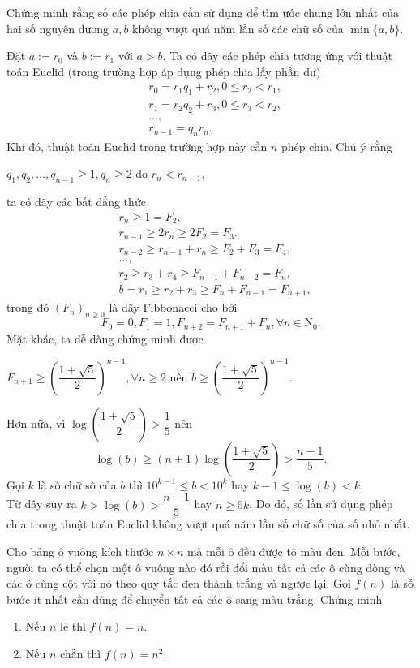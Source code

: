 \begin{bt} [Láme]
	Chứng minh rằng số các phép chia cần sử dụng để tìm ước chung lớn nhất của hai số nguyên dương $a,b$ không vượt quá năm lần số các chữ số của $ \min{\{a,b\}} $.
	
	Đặt $a:= r_{0} $ và $b:= r_{1}$ với $a>b$. Ta có dãy các phép chia tương ứng với thuật toán Euclid $($trong trường hợp áp dụng phép chia lấy phần dư$)$
	\begin{eqnarray*}
		& r_0=r_1q_1+r_2,0 \le r_2 <r_1,\\
		& r_1=r_2q_2+r_3,0 \le r_3 <r_2,\\
		& \ldots,\\
		& r_{n-1}=q_nr_n.
	\end{eqnarray*}
	Khi đó, thuật toán Euclid trong trường hợp này cần $n$ phép chia. Chú ý rằng\\
	\centerline{$q_1,q_2,\ldots,q_{n-1} \ge 1, q_n \ge 2$ do $r_n <r_{n-1},$}  
	ta có dãy các bất đẳng thức
	\begin{eqnarray*}
		&r_n \ge 1 = F_2,\\
		&r_{n-1} \ge 2r_n \ge 2F_2 = F_3.\,\\
		&r_{n-2} \ge r_{n-1}+r_{n}  \ge F_2 + F_3 =F_4,\\
		&\ldots,\\
		&r_2 \ge r_3 +r_4 \ge F_{n-1}+F_{n-2}=F_{n},\\
		&b=r_1 \ge r_2+r_3 \ge F_{n}+F_{n-1}=F_{n+1},
	\end{eqnarray*}
	trong đó $(F_n)_{n \ge 0}$ là dãy Fibbonacci cho bởi 
	$$F_{0}=0,F_{1}=1,F_{n+2}=F_{n+1}+F_{n}, \forall n \in \mathrm{N_0}.$$
	Mặt khác, ta dễ dàng chứng minh được\\
	\centerline{$F_{n+1} \ge \left( \dfrac{1+\sqrt{5}}{2}\right)^{n-1}, \forall n \ge 2$ nên $b \ge \left( \dfrac{1+\sqrt{5}}{2}\right)^{n-1} $.}
	Hơn nữa, vì $\log \left( \dfrac{1+\sqrt{5}}{2}\right) > \dfrac{1}{5}$ nên\\
	$$\log(b) \ge \left( n+1 \right) \log \left( \dfrac{1+\sqrt{5}}{2}\right) > \dfrac{n-1}{5}.$$
	Gọi $k$ là số chữ số của $b$ thì $10^{k-1} \le b <10^k$ hay $k-1 \le \log(b) <k$.\\ 
	Từ đây suy ra $k > \log(b)> \dfrac{n-1}{5}$ hay $n \ge 5k$. Do đó, số lần sử dụng phép chia trong thuật toán Euclid không vượt quá năm lần số chữ số của số nhỏ nhất.
\end{bt}

\begin{bt}
	Cho bảng ô vuông kích thước $n \times n$ mà mỗi ô đều được tô màu đen. Mỗi bước, người ta có thể chọn một ô vuông nào đó rồi đổi màu tất cả các ô cùng dòng và các ô cùng cột với nó theo quy tắc đen thành trắng và ngược lại. Gọi $f(n)$ là số bước ít nhất cần dùng để chuyển tất cả các ô sang màu trắng. Chứng minh
	\begin{enumerate}
		\item Nếu $n$ lẻ thì $f(n) = n$.
		\item Nếu $n$ chẵn thì $f(n) = n^2$.
	\end{enumerate}
	
\end{bt}

